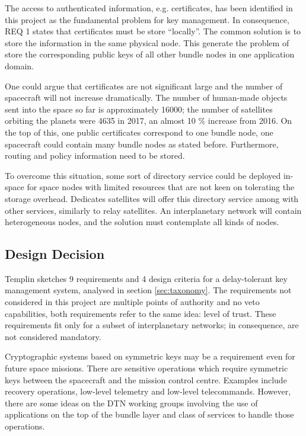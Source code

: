 The access to authenticated information, e.g. certificates, has been identified in this project as the fundamental problem for key management. In consequence, REQ 1 states that certificates must be store ``locally''. The common solution is to store the information in the same physical node. This generate the problem of store the corresponding public keys of all other bundle nodes in one application domain. 

One could argue that certificates are not significant large and the number of spacecraft will not increase dramatically. The number of human-made objects sent into the space so far is approximately 16000; the number of satellites orbiting the planets were 4635 in 2017, an almost 10 \% increase from 2016. On the top of this, one public certificates correspond to one bundle node, one spacecraft could contain many bundle nodes as stated before. Furthermore, routing and policy information need to be stored.      

To overcome this situation, some sort of directory service could be deployed in-space for space nodes with limited resources that are not keen on tolerating the storage overhead. Dedicates satellites will offer this directory service among with other services, similarly to relay satellites. An interplanetary network will contain heterogeneous nodes, and the solution must contemplate all kinds of nodes. 


\subsection{Design Decision}


Templin \cite{templin-dtnskmreq-00} sketches 9 requirements and 4 design criteria for a delay-tolerant key management system, analysed in section \ref{sec:taxonomy}. The requirements not considered in this project are multiple points of authority and no veto capabilities, both requirements refer to the same idea: level of trust. These requirements fit only for a subset of interplanetary networks; in consequence, are not considered mandatory. 

Cryptographic systems based on symmetric keys may be a requirement even for future space missions. There are sensitive operations which require symmetric keys between the spacecraft and the mission control centre. Examples include recovery operations, low-level telemetry and low-level telecommands. However, there are some ideas on the DTN working groups involving the use of applications on the top of the bundle layer and class of services to handle those operations. 

